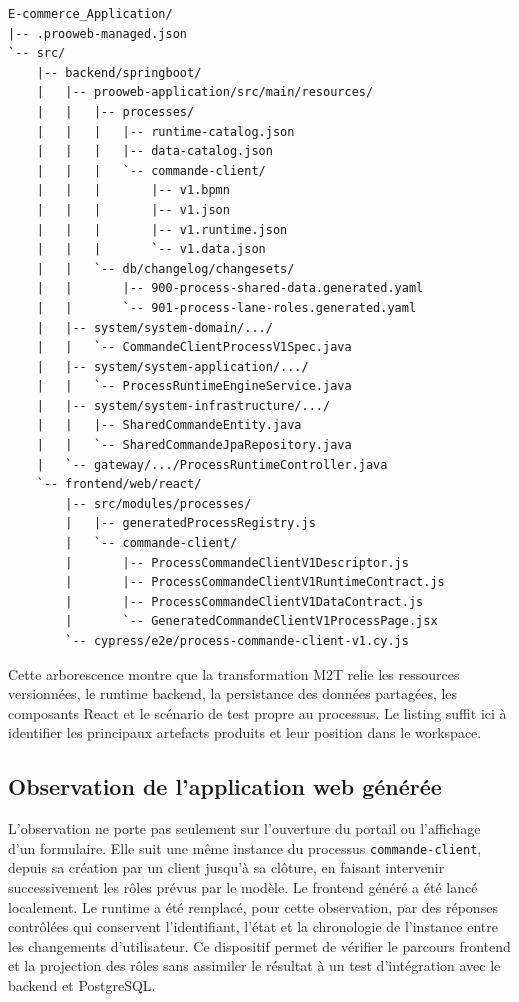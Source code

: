 \begin{lstlisting}[breaklines=true,caption={Arborescence simplifiée des artefacts générés pour la commande client},label={lst:chap4-arborescence-commande}]
E-commerce_Application/
|-- .prooweb-managed.json
`-- src/
    |-- backend/springboot/
    |   |-- prooweb-application/src/main/resources/
    |   |   |-- processes/
    |   |   |   |-- runtime-catalog.json
    |   |   |   |-- data-catalog.json
    |   |   |   `-- commande-client/
    |   |   |       |-- v1.bpmn
    |   |   |       |-- v1.json
    |   |   |       |-- v1.runtime.json
    |   |   |       `-- v1.data.json
    |   |   `-- db/changelog/changesets/
    |   |       |-- 900-process-shared-data.generated.yaml
    |   |       `-- 901-process-lane-roles.generated.yaml
    |   |-- system/system-domain/.../
    |   |   `-- CommandeClientProcessV1Spec.java
    |   |-- system/system-application/.../
    |   |   `-- ProcessRuntimeEngineService.java
    |   |-- system/system-infrastructure/.../
    |   |   |-- SharedCommandeEntity.java
    |   |   `-- SharedCommandeJpaRepository.java
    |   `-- gateway/.../ProcessRuntimeController.java
    `-- frontend/web/react/
        |-- src/modules/processes/
        |   |-- generatedProcessRegistry.js
        |   `-- commande-client/
        |       |-- ProcessCommandeClientV1Descriptor.js
        |       |-- ProcessCommandeClientV1RuntimeContract.js
        |       |-- ProcessCommandeClientV1DataContract.js
        |       `-- GeneratedCommandeClientV1ProcessPage.jsx
        `-- cypress/e2e/process-commande-client-v1.cy.js
\end{lstlisting}

Cette arborescence montre que la transformation M2T relie les ressources
versionnées, le runtime backend, la persistance des données partagées, les
composants React et le scénario de test propre au processus. Le listing suffit
ici à identifier les principaux artefacts produits et leur position dans le
workspace.

\subsection{Observation de l'application web générée}

L'observation ne porte pas seulement sur l'ouverture du portail ou l'affichage
d'un formulaire. Elle suit une même instance du processus
\texttt{commande-client}, depuis sa création par un client jusqu'à sa clôture,
en faisant intervenir successivement les rôles prévus par le modèle. Le frontend
généré a été lancé localement. Le runtime a été remplacé, pour cette
observation, par des réponses contrôlées qui conservent l'identifiant, l'état et
la chronologie de l'instance entre les changements d'utilisateur. Ce dispositif
permet de vérifier le parcours frontend et la projection des rôles sans assimiler
le résultat à un test d'intégration avec le backend et PostgreSQL.

